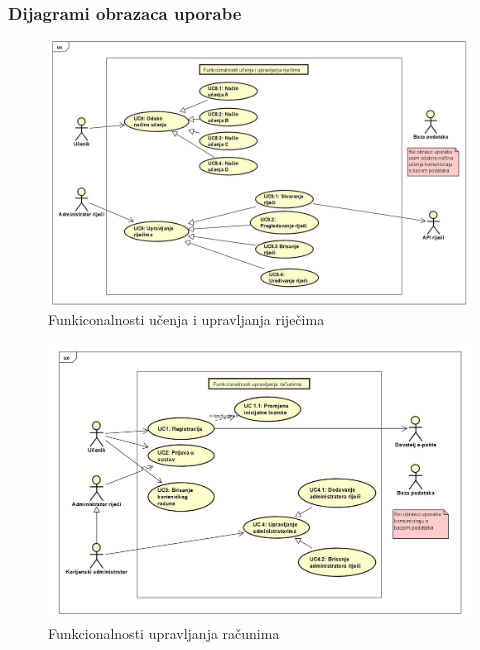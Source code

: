 					
					\subsubsection{Dijagrami obrazaca uporabe}
					
					\begin{figure}[H]
						\includegraphics[scale=0.30]{dijagrami/dijagram1.jpg} 
						\centering
						\caption{Funkiconalnosti učenja i upravljanja riječima}
						\label{fig:dijagram1}
					\end{figure}
					
					\begin{figure}[H]
						\includegraphics[scale=0.35]{dijagrami/dijagram2.jpg} 
						\centering
						\caption{Funkcionalnosti upravljanja računima}
						\label{fig:dijagram2}
					\end{figure}
					
